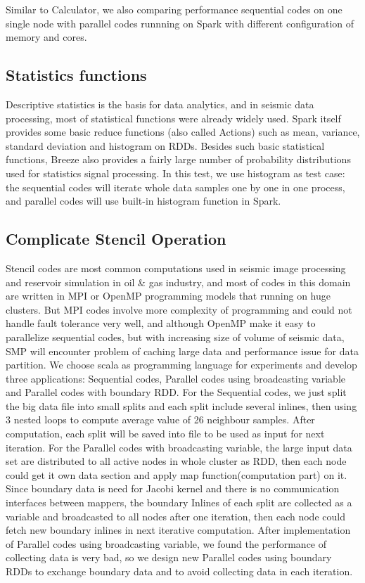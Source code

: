 Similar to Calculator, we also comparing performance sequential codes on one single node with parallel codes runnning on Spark with different configuration of memory and cores. 


\subsection{Statistics functions}
Descriptive statistics is the basis for data analytics, and in seismic data processing, most of statistical functions were already widely used. Spark itself provides some basic reduce functions (also called Actions) such as mean, variance, standard deviation and histogram on RDDs. Besides such basic statistical functions, Breeze also provides a fairly large number of probability distributions used for statistics signal processing. In this test, we use histogram as test case: the sequential codes will iterate whole data samples one by one in one process, and parallel codes will use built-in histogram function in Spark.


\subsection{Complicate Stencil Operation}

Stencil codes are most common computations used in seismic image processing and reservoir simulation in oil \& gas industry, and most of codes in this domain are written in MPI or OpenMP programming models that running on huge clusters. But MPI codes involve more complexity of programming and could not handle fault tolerance very well, and although OpenMP make it easy to parallelize sequential codes, but with increasing size of volume of seismic data, SMP will encounter problem of caching large data and performance issue for data partition. 
We choose scala as programming language for experiments and develop three applications: Sequential codes, Parallel codes using broadcasting variable and Parallel codes with boundary RDD. For the Sequential codes, we just split the big data file into small splits and each split include several inlines, then using 3 nested loops to compute average value of 26 neighbour samples. After computation, each split will be saved into file to be used as input for next iteration. For the Parallel codes with broadcasting variable, the large input data set are distributed to all active nodes in whole cluster as RDD, then each node could get it own data section and apply map function(computation part) on it. Since boundary data is need for Jacobi kernel and there is no communication interfaces between mappers, the boundary Inlines of each split are collected as a variable and broadcasted to all nodes after one iteration, then each node could fetch new boundary inlines in next iterative computation. After implementation of Parallel codes using broadcasting variable, we found the performance of collecting data is very bad, so we design new Parallel codes using boundary RDDs to exchange boundary data and to avoid collecting data in each iteration. 

